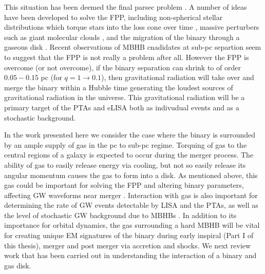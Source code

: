 This situation has been deemed the final parsec problem
\citep[FPP][]{MilosPhinney:2001}. A number of ideas have been developed to
solve the FPP, including non-spherical stellar distributions which torque
stars into the loss cone over time \citep{triaxialFPPsolns}, massive
perturbers such as giant molecular clouds \citep{massivpertFPPsolns}, and the
migration of the binary through a gaseous disk \citep{GoldRix:2000,
ArmNat:2002:ApJL}. Recent observations of MBHB cnadidates at sub-pc separtion
seem to suggest that the FPP is not really a problem after all. However the FPP is
overcome (or not overcome), if the binary separation can shrink to of order $0.05-0.15$ pc (for
$q=1 \rightarrow 0.1$), then gravitational radiation will take over and merge
the binary within a Hubble time \citep{Peters:1964} generating the loudest
sources of gravitational radiation in the universe. This gravitational
radiation will be a primary target of the PTAs and eLISA both as indivudual
events and as a stochastic background.

In the work presented here we consider the case where the binary is surrounded
by an ample supply of gas in the pc to sub-pc regime. Torquing of gas to the
central regions of a galaxy is expected to occur during the merger
process\citep{BarnesHernquist:1996, Barnes:2002}. The ability of gas to easily
release energy via cooling, but not so easily release its angular momentum
causes the gas to form into a disk. As mentioned above, this gas could be important
for solving the FPP and altering binary parameters, affecting GW
waveforms near merger \citep[\emph{e.g.}][]{ArmNat:2005, YKH:2011:L,
GWgas_ecc}. Interaction with gas is also important for determining the rate of
GW events detectable by LISA and the PTAs, as well as the level of stochastic
GW background due to MBHBs \citep{SesanaKocsis:, Shannon:2015, PTAsGWB}. In
addition to its importance for orbital dynamics, the gas surrounding a hard
MBHB will be vital for creating unique EM signatures of the binary during
early inspiral (Part I of this thesis), merger \citep{squeezing} and post
merger \citep{kickEMsigs} via accretion and shocks. We next review work that
has been carried out in understanding the interaction of a binary and gas
disk.


	
